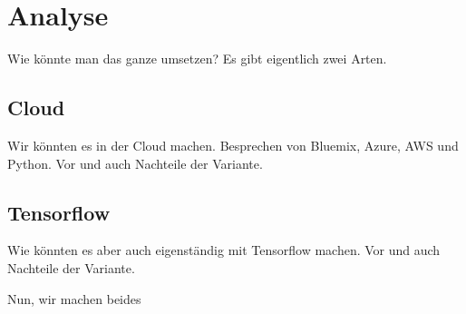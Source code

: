 \section{Analyse}
Wie könnte man das ganze umsetzen? Es gibt eigentlich zwei Arten.

\subsection{Cloud}
Wir könnten es in der Cloud machen. Besprechen von Bluemix, Azure, AWS und Python. Vor und auch Nachteile der Variante.

\subsection{Tensorflow}
Wie könnten es aber auch eigenständig mit Tensorflow machen. Vor und auch Nachteile der Variante.

Nun, wir machen beides